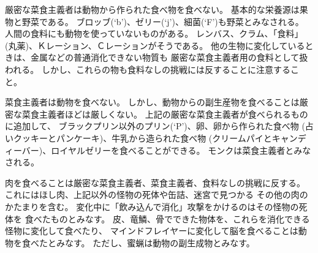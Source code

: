 厳密な菜食主義者は動物から作られた食べ物を食べない。
基本的な栄養源は果物と野菜である。
ブロッブ(`b')、ゼリー(`j')、細菌(`F')も野菜とみなされる。
人間の食料にも動物を使っていないものがある。
レンバス、クラム、「食料」(丸薬)、Ｋレーション、Ｃレーションがそうである。
他の生物に変化しているときは、金属などの普通消化できない物質も
厳密な菜食主義者用の食料として扱われる。
しかし、これらの物も食料なしの挑戦には反することに注意すること。

菜食主義者は動物を食べない。
しかし、動物からの副生産物を食べることは厳密な菜食主義者ほどは厳しくない。
上記の厳密な菜食主義者が食べられるものに追加して、
ブラックプリン以外のプリン(`P')、卵、卵から作られた食べ物
(占いクッキーとパンケーキ)、牛乳から造られた食べ物
(クリームパイとキャンディーバー)、ロイヤルゼリーを食べることができる。
モンクは菜食主義者とみなされる。

肉を食べることは厳密な菜食主義者、菜食主義者、食料なしの挑戦に反する。
これにはほし肉、上記以外の怪物の死体や缶詰、迷宮で見つかる
その他の肉のかたまりを含む。
変化中に「飲み込んで消化」攻撃をかけるのはその怪物の死体を
食べたものとみなす。
皮、竜鱗、骨でできた物体を、これらを消化できる怪物に変化して食べたり、
マインドフレイヤーに変化して脳を食べることは動物を食べたとみなす。
ただし、蜜蝋は動物の副生成物とみなす。

